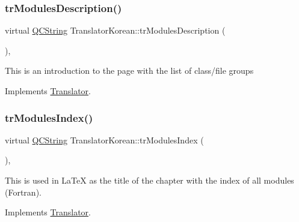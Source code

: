 \mbox{\label{class_translator_korean_a72058383adde1d48bb365defcd561235}} 
\subsubsection{\texorpdfstring{trModulesDescription()}{trModulesDescription()}}
{\footnotesize\ttfamily virtual \mbox{\hyperlink{class_q_c_string}{Q\+C\+String}} Translator\+Korean\+::tr\+Modules\+Description (\begin{DoxyParamCaption}{ }\end{DoxyParamCaption})\hspace{0.3cm}{\ttfamily [inline]}, {\ttfamily [virtual]}}

This is an introduction to the page with the list of class/file groups 

Implements \mbox{\hyperlink{class_translator}{Translator}}.

\mbox{\label{class_translator_korean_a27ed6bf015e7486973035b3a4dc79707}} 
\subsubsection{\texorpdfstring{trModulesIndex()}{trModulesIndex()}}
{\footnotesize\ttfamily virtual \mbox{\hyperlink{class_q_c_string}{Q\+C\+String}} Translator\+Korean\+::tr\+Modules\+Index (\begin{DoxyParamCaption}{ }\end{DoxyParamCaption})\hspace{0.3cm}{\ttfamily [inline]}, {\ttfamily [virtual]}}

This is used in La\+TeX as the title of the chapter with the index of all modules (Fortran). 

Implements \mbox{\hyperlink{class_translator}{Translator}}.

\mbox{\label{class_translator_korean_af469ef927e0c319daced69693d93f5f4}} 
